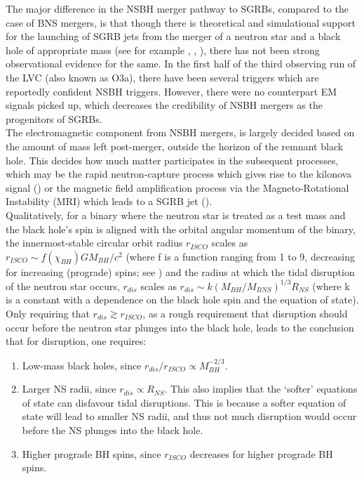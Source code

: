     The major difference in the NSBH merger pathway to SGRBs, compared to the case of
    BNS mergers, is that though there is theoretical and simulational support for the
    launching of SGRB jets from the merger of a neutron star and a black hole of
    appropriate mass (see for example \cite{ruiz_2020}, \cite{shibata_2019},
    \cite{foucart_2020}), there has not been strong observational evidence for the same.
    In the first half of the third observing run of the LVC (also known as O3a), there
    have been several triggers which are reportedly confident NSBH triggers. However,
    there were no counterpart EM signals picked up, which decreases the credibility of
    NSBH mergers as the progenitors of SGRBs.\\
    The electromagnetic component from NSBH mergers, is largely decided based on the
    amount of mass left post-merger, outside the horizon of the remnant black hole.
    This decides how much matter participates in the subsequent processes, which may be
    the rapid neutron-capture process which gives rise to the kilonova signal
    (\cite{metzger_2019}) or the magnetic field amplification process via the
    Magneto-Rotational Instability (MRI) which leads to a SGRB jet
    (\cite{postnov_2019}).\\
    Qualitatively, for a binary where the neutron star is treated as a test mass and the
    black hole's spin is aligned with the orbital angular momentum of the binary, the
    innermost-stable circular orbit radius $r_{ISCO}$ scales as $r_{ISCO} \sim
    f(\chi_{BH}) G M_{BH}/c^2$ (where f is a function ranging from 1 to 9, decreasing
    for increasing (prograde) spins; see \cite{bardeen_1972}) and the radius at which
    the tidal disruption of the neutron star occurs, $r_{dis}$ scales as $r_{dis} \sim k
    (M_{BH}/M_{BNS})^{1/3} R_{NS}$ (where k is a constant with a dependence on the black
    hole spin and the equation of state). Only requiring that $r_{dis} \gtrsim
    r_{ISCO}$, as a rough requirement that disruption should occur before the neutron
    star plunges into the black hole, leads to the conclusion that for disruption, one
    requires:

    \begin{enumerate}[label=\alph*.)]

        \item Low-mass black holes, since $r_{dis}/r_{ISCO} \propto M_{BH}^{-2/3}$.

        \item Larger NS radii, since $r_{dis} \propto R_{NS}$. This also implies
            that the `softer' equations of state can disfavour tidal disruptions. This
            is because a softer equation of state will lead to smaller NS radii, and
            thus not much disruption would occur before the NS plunges into the black
            hole.

        \item Higher prograde BH spins, since $r_{ISCO}$ decreases for higher prograde
            BH spins.

    \end{enumerate}

